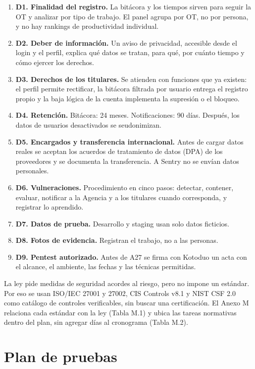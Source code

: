 \documentclass[11pt,a4paper]{article}
\begin{document}
\begin{enumerate}
\item \textbf{D1. Finalidad del registro.} La bitácora y los tiempos sirven para seguir la OT y analizar por tipo de trabajo. El panel agrupa por OT, no por persona, y no hay rankings de productividad individual.
\item \textbf{D2. Deber de información.} Un aviso de privacidad, accesible desde el login y el perfil, explica qué datos se tratan, para qué, por cuánto tiempo y cómo ejercer los derechos.
\item \textbf{D3. Derechos de los titulares.} Se atienden con funciones que ya existen: el perfil permite rectificar, la bitácora filtrada por usuario entrega el registro propio y la baja lógica de la cuenta implementa la supresión o el bloqueo.
\item \textbf{D4. Retención.} Bitácora: 24 meses. Notificaciones: 90 días. Después, los datos de usuarios desactivados se seudonimizan.
\item \textbf{D5. Encargados y transferencia internacional.} Antes de cargar datos reales se aceptan los acuerdos de tratamiento de datos (DPA) de los proveedores y se documenta la transferencia. A Sentry no se envían datos personales.
\item \textbf{D6. Vulneraciones.} Procedimiento en cinco pasos: detectar, contener, evaluar, notificar a la Agencia y a los titulares cuando corresponda, y registrar lo aprendido.
\item \textbf{D7. Datos de prueba.} Desarrollo y staging usan solo datos ficticios.
\item \textbf{D8. Fotos de evidencia.} Registran el trabajo, no a las personas.
\item \textbf{D9. Pentest autorizado.} Antes de A27 se firma con Kotoduo un acta con el alcance, el ambiente, las fechas y las técnicas permitidas.
\end{enumerate}

La ley pide medidas de seguridad acordes al riesgo, pero no impone un estándar. Por eso se usan ISO/IEC 27001 y 27002, CIS Controls v8.1 y NIST CSF 2.0 como catálogo de controles verificables, sin buscar una certificación. El Anexo M relaciona cada estándar con la ley (Tabla M.1) y ubica las tareas normativas dentro del plan, sin agregar días al cronograma (Tabla M.2).

\newpage
\section{Plan de pruebas}
\end{document}
